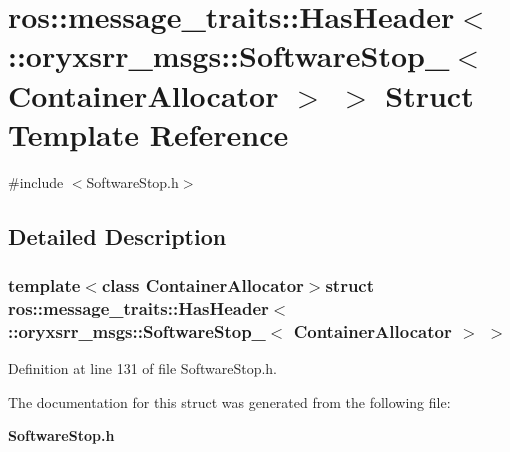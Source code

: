 \section{ros\-:\-:message\-\_\-traits\-:\-:\-Has\-Header$<$ \-:\-:oryxsrr\-\_\-msgs\-:\-:\-Software\-Stop\-\_\-$<$ \-Container\-Allocator $>$ $>$ \-Struct \-Template \-Reference}
\label{structros_1_1message__traits_1_1HasHeader_3_01_1_1oryxsrr__msgs_1_1SoftwareStop___3_01ContainerAllocator_01_4_01_4}


{\ttfamily \#include $<$\-Software\-Stop.\-h$>$}



\subsection{\-Detailed \-Description}
\subsubsection*{template$<$class Container\-Allocator$>$struct ros\-::message\-\_\-traits\-::\-Has\-Header$<$ \-::oryxsrr\-\_\-msgs\-::\-Software\-Stop\-\_\-$<$ Container\-Allocator $>$ $>$}



\-Definition at line 131 of file \-Software\-Stop.\-h.



\-The documentation for this struct was generated from the following file\-:\begin{DoxyCompactItemize}
\item 
{\bf \-Software\-Stop.\-h}\end{DoxyCompactItemize}
